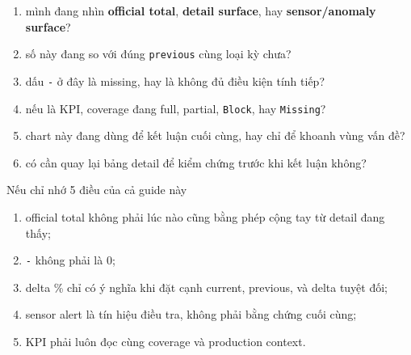 \begin{enumerate}[label=-]
\item mình đang nhìn \textbf{official total}, \textbf{detail surface}, hay \textbf{sensor/anomaly surface}?
\item số này đang so với đúng \texttt{previous} cùng loại kỳ chưa?
\item dấu \texttt{-} ở đây là missing, hay là không đủ điều kiện tính tiếp?
\item nếu là KPI, coverage đang full, partial, \texttt{Block}, hay \texttt{Missing}?
\item chart này đang dùng để kết luận cuối cùng, hay chỉ để khoanh vùng vấn đề?
\item có cần quay lại bảng detail để kiểm chứng trước khi kết luận không?
\end{enumerate}

\begin{ReaderNote}{Nếu chỉ nhớ 5 điều của cả guide này}
\begin{enumerate}[label=-]
\item official total không phải lúc nào cũng bằng phép cộng tay từ detail đang thấy;
\item \texttt{-} không phải là 0;
\item delta \% chỉ có ý nghĩa khi đặt cạnh current, previous, và delta tuyệt đối;
\item sensor alert là tín hiệu điều tra, không phải bằng chứng cuối cùng;
\item KPI phải luôn đọc cùng coverage và production context.
\end{enumerate}
\end{ReaderNote}
